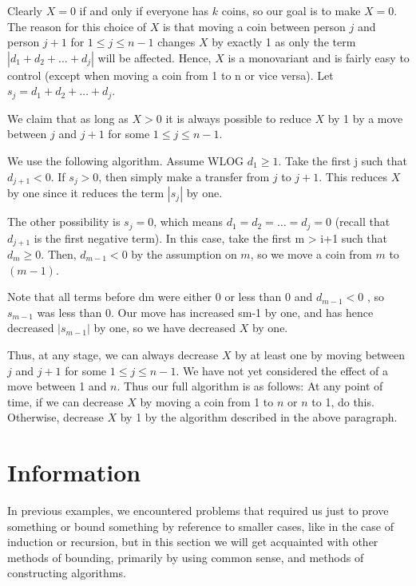 Clearly $X = 0$ if and only if everyone has $k$ coins, so our goal is to make $X = 0$. The reason for this choice of $X$ is that moving a coin between person $j$ and person $j + 1$ for $1 \leq j \leq n-1$ changes $X$ by exactly 1 as only the term $|d_1 + d_2 + \dots + d_j|$ will be affected. Hence, $X$ is a monovariant and is fairly easy to control (except when moving a coin from 1 to n or vice versa). Let $s_j = d_1 + d_2 + \dots + d_j$.

We claim that as long as $X > 0$ it is always possible to reduce $X$ by 1 by a move between $j$ and $j +1$ for some $1 \leq j \leq n -1$.

We use the following algorithm. Assume WLOG $d_1 \geq 1$. Take the first j such that $d_{j+1} < 0$. If $s_j > 0$, then simply make a transfer from $j$ to $j + 1$. This reduces $X$ by one since it reduces the term $|s_j|$ by one.

The other possibility is $s_j = 0$, which means $d_1 = d_2 = \dots = d_j = 0$ (recall that $d_{j+1}$ is the first negative term). In this case, take the first m > i+1 such that $d_m \geq 0$. Then, $d_{m-1} < 0$ by the assumption on $m$, so we move a coin from $m$ to $(m-1)$.

Note that all terms before dm were either 0 or less than 0 and $d_{m-1} < 0$ , so $s_{m-1}$ was less than 0. Our move has increased sm-1 by one, and has hence decreased $|s_{m-1}|$ by one, so we have decreased $X$ by one.

Thus, at any stage, we can always decrease $X$ by at least one by moving between $j$ and $j +1$ for some $1 \le j \le n -1$. We have not yet considered the effect of a move between 1 and $n$. Thus our full algorithm is as follows: At any point of time, if we can decrease $X$ by moving a coin from 1 to $n$ or $n$ to 1, do this. Otherwise, decrease $X$ by 1 by the algorithm described in the above paragraph.

\newpage

\section{Information}

In previous examples, we encountered problems that required us just to prove something or bound something by reference to smaller cases, like in the case of induction or recursion, but in this section we will get acquainted with other methods of bounding, primarily by using common sense, and methods of constructing algorithms.  

